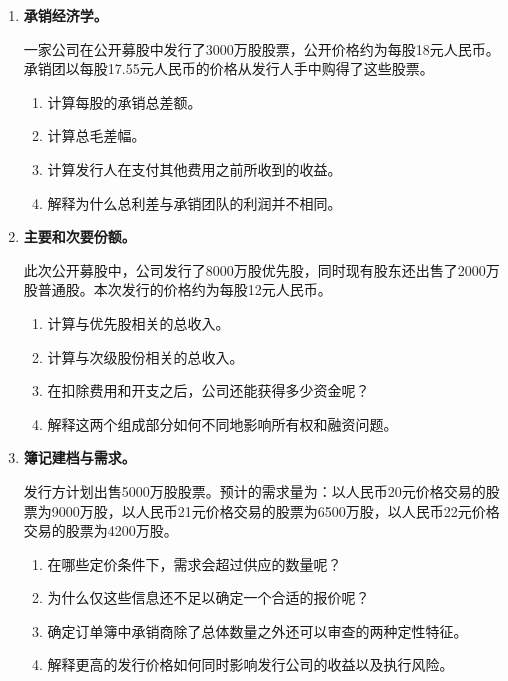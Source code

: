 

\begin{enumerate}

\item \textbf{承销经济学。}

一家公司在公开募股中发行了3000万股股票，公开价格约为每股18元人民币。承销团以每股17.55元人民币的价格从发行人手中购得了这些股票。

\begin{enumerate}
\item 计算每股的承销总差额。
\item 计算总毛差幅。
\item 计算发行人在支付其他费用之前所收到的收益。
\item 解释为什么总利差与承销团队的利润并不相同。
\end{enumerate}

\item \textbf{主要和次要份额。}

此次公开募股中，公司发行了8000万股优先股，同时现有股东还出售了2000万股普通股。本次发行的价格约为每股12元人民币。

\begin{enumerate}
\item 计算与优先股相关的总收入。
\item 计算与次级股份相关的总收入。
\item 在扣除费用和开支之后，公司还能获得多少资金呢？
\item 解释这两个组成部分如何不同地影响所有权和融资问题。
\end{enumerate}

\item \textbf{簿记建档与需求。}

发行方计划出售5000万股股票。预计的需求量为：以人民币20元价格交易的股票为9000万股，以人民币21元价格交易的股票为6500万股，以人民币22元价格交易的股票为4200万股。

\begin{enumerate}
\item 在哪些定价条件下，需求会超过供应的数量呢？
\item 为什么仅这些信息还不足以确定一个合适的报价呢？
\item 确定订单簿中承销商除了总体数量之外还可以审查的两种定性特征。
\item 解释更高的发行价格如何同时影响发行公司的收益以及执行风险。
\end{enumerate}


\end{enumerate}
